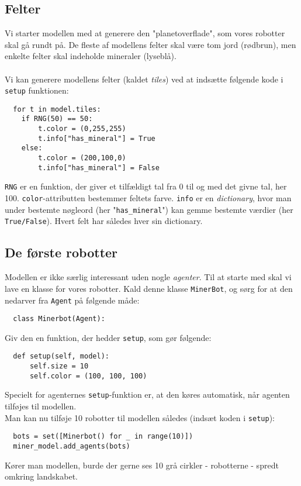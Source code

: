 \documentclass[12pt]{article}
\begin{document}
\subsection{Felter}
Vi starter modellen med at generere den "planetoverflade", som vores robotter skal gå rundt på. De fleste af modellens felter skal være tom jord (rødbrun), men enkelte felter skal indeholde mineraler (lyseblå).\\\\
Vi kan generere modellens felter (kaldet \textit{tiles}) ved at indsætte følgende kode i \texttt{setup} funktionen:
\begin{lstlisting}
  for t in model.tiles:
    if RNG(50) == 50:
        t.color = (0,255,255)
        t.info["has_mineral"] = True
    else:
        t.color = (200,100,0)
        t.info["has_mineral"] = False
\end{lstlisting}
\texttt{RNG} er en funktion, der giver et tilfældigt tal fra 0 til og med det givne tal, her 100. \texttt{color}-attributten bestemmer feltets farve. \texttt{info} er en \textit{dictionary}, hvor man under bestemte nøgleord (her "\texttt{has\_mineral}") kan gemme bestemte værdier (her \texttt{True/False}). Hvert felt har således hver sin dictionary.

\subsection{De første robotter}
Modellen er ikke særlig interessant uden nogle \textit{agenter}. Til at starte med skal vi lave en klasse for vores robotter. Kald denne klasse \texttt{MinerBot}, og sørg for at den nedarver fra \texttt{Agent} på følgende måde:
\begin{lstlisting}
  class Minerbot(Agent):
\end{lstlisting}
Giv den en funktion, der hedder \texttt{setup}, som gør følgende:
\begin{lstlisting}
  def setup(self, model):
      self.size = 10
      self.color = (100, 100, 100)
\end{lstlisting}
Specielt for agenternes \texttt{setup}-funktion er, at den køres automatisk, når agenten tilføjes til modellen.\\
Man kan nu tilføje 10 robotter til modellen således (indsæt koden i \texttt{setup}):
\begin{lstlisting}
  bots = set([Minerbot() for _ in range(10)])
  miner_model.add_agents(bots)
\end{lstlisting}
Kører man modellen, burde der gerne ses 10 grå cirkler - robotterne - spredt omkring landskabet.
\end{document}
